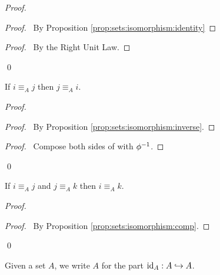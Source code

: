 \begin{proof}
 \pf
 \begin{proof}
   \pf\ By Proposition \ref{prop:sets:isomorphism:identity}
 \end{proof}
 \begin{proof}
   \pf\ By the Right Unit Law.
 \end{proof}
 \qed
\end{proof}

\begin{prop}
 If $i \equiv_A j$ then $j \equiv_A i$.
\end{prop}

\begin{proof}
 \pf
 \begin{proof}
   \pf\ By Proposition \ref{prop:sets:isomorphism:inverse}.
 \end{proof}
 \begin{proof}
   \pf\ Compose both sides of  with ${\phi}^{-1}$.
 \end{proof}
 \qed
\end{proof}

\begin{prop}
  If $i \equiv_A j$ and $j \equiv_A k$ then $i \equiv_A k$.
\end{prop}

\begin{proof}
  \pf
  \begin{proof}
    \pf\ By Proposition \ref{prop:sets:isomorphism:comp}.
  \end{proof}
\qed
\end{proof}

\begin{df}
  Given a set $A$, we write $A$ for the part $\mathrm{id}_{A} : A \hookrightarrow A$.
\end{df}

